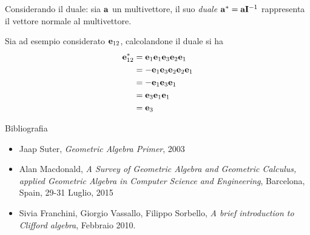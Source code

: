 \begin{frame}
    Considerando il duale: sia \(\mathbf{a}\) un multivettore, 
    il suo \emph{duale} \(\mathbf{a}^{*} = \mathbf{a}\mathbf{I}^{-1}\) rappresenta il vettore normale al multivettore.

    Sia ad esempio considerato \(\mathbf{e}_{12}\), calcolandone il duale si ha
    \[\begin{aligned}
        \mathbf{e}_{12}^{*} & = \mathbf{e}_{1}\mathbf{e}_{1}\mathbf{e}_{3}\mathbf{e}_{2}\mathbf{e}_{1} \\ 
            & = - \mathbf{e}_{1}\mathbf{e}_{3}\mathbf{e}_{2}\mathbf{e}_{2}\mathbf{e}_{1} \\ 
            & = - \mathbf{e}_{1}\mathbf{e}_{3}\mathbf{e}_{1} \\ 
            & = \mathbf{e}_{3}\mathbf{e}_{1}\mathbf{e}_{1} \\ 
            & = \mathbf{e}_{3}
    \end{aligned}\]
\end{frame}
\begin{frame}{Bibliografia}
    \begin{itemize}
        \item Jaap Suter, \emph{Geometric Algebra Primer}, 2003
        \item Alan Macdonald, \emph{A Survey of Geometric Algebra and Geometric Calculus,
            applied Geometric Algebra in Computer Science and Engineering}, Barcelona, 
        Spain, 29-31 Luglio, 2015

        \item Sivia Franchini, Giorgio Vassallo, Filippo Sorbello, 
            \emph {A brief introduction to Clifford algebra},
            Febbraio 2010.
    \end{itemize}
\end{frame}
